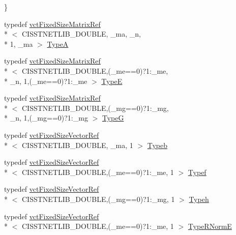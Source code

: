 \begin{DoxyCompactItemize}
 \}
\item 
typedef \hyperlink{classvct_fixed_size_matrix_ref}{vct\-Fixed\-Size\-Matrix\-Ref}\\*
$<$ C\-I\-S\-S\-T\-N\-E\-T\-L\-I\-B\-\_\-\-D\-O\-U\-B\-L\-E, \-\_\-ma, \-\_\-n, \\*
1, \-\_\-ma $>$ \hyperlink{classnmr_l_sq_lin_solution_fixed_size_a7a9b41c20d4c0b44cdae4bf7b39f7e39}{Type\-A}
\item 
typedef \hyperlink{classvct_fixed_size_matrix_ref}{vct\-Fixed\-Size\-Matrix\-Ref}\\*
$<$ C\-I\-S\-S\-T\-N\-E\-T\-L\-I\-B\-\_\-\-D\-O\-U\-B\-L\-E,(\-\_\-me==0)?1\-:\-\_\-me, \\*
\-\_\-n, 1,(\-\_\-me==0)?1\-:\-\_\-me $>$ \hyperlink{classnmr_l_sq_lin_solution_fixed_size_a74ac0c633236e0b04e8969f7fbfc92a6}{Type\-E}
\item 
typedef \hyperlink{classvct_fixed_size_matrix_ref}{vct\-Fixed\-Size\-Matrix\-Ref}\\*
$<$ C\-I\-S\-S\-T\-N\-E\-T\-L\-I\-B\-\_\-\-D\-O\-U\-B\-L\-E,(\-\_\-mg==0)?1\-:\-\_\-mg, \\*
\-\_\-n, 1,(\-\_\-mg==0)?1\-:\-\_\-mg $>$ \hyperlink{classnmr_l_sq_lin_solution_fixed_size_a043640ee3f0a5a11b4b6972ddd9c8b90}{Type\-G}
\item 
typedef \hyperlink{classvct_fixed_size_vector_ref}{vct\-Fixed\-Size\-Vector\-Ref}\\*
$<$ C\-I\-S\-S\-T\-N\-E\-T\-L\-I\-B\-\_\-\-D\-O\-U\-B\-L\-E, \-\_\-ma, 1 $>$ \hyperlink{classnmr_l_sq_lin_solution_fixed_size_a9fca08d2c610b0087085dd343e5d171b}{Typeb}
\item 
typedef \hyperlink{classvct_fixed_size_vector_ref}{vct\-Fixed\-Size\-Vector\-Ref}\\*
$<$ C\-I\-S\-S\-T\-N\-E\-T\-L\-I\-B\-\_\-\-D\-O\-U\-B\-L\-E,(\-\_\-me==0)?1\-:\-\_\-me, 1 $>$ \hyperlink{classnmr_l_sq_lin_solution_fixed_size_ada2bec63c68d10997259c4c0fff5a085}{Typef}
\item 
typedef \hyperlink{classvct_fixed_size_vector_ref}{vct\-Fixed\-Size\-Vector\-Ref}\\*
$<$ C\-I\-S\-S\-T\-N\-E\-T\-L\-I\-B\-\_\-\-D\-O\-U\-B\-L\-E,(\-\_\-mg==0)?1\-:\-\_\-mg, 1 $>$ \hyperlink{classnmr_l_sq_lin_solution_fixed_size_aa86f02bad0142d8bccac845d426bb153}{Typeh}
\item 
typedef \hyperlink{classvct_fixed_size_vector_ref}{vct\-Fixed\-Size\-Vector\-Ref}\\*
$<$ C\-I\-S\-S\-T\-N\-E\-T\-L\-I\-B\-\_\-\-D\-O\-U\-B\-L\-E,(\-\_\-me==0)?1\-:\-\_\-me, 1 $>$ \hyperlink{classnmr_l_sq_lin_solution_fixed_size_a8d12c1d86e766d8b7782e39f38b90073}{Type\-R\-Norm\-E}

\end{DoxyCompactItemize}
